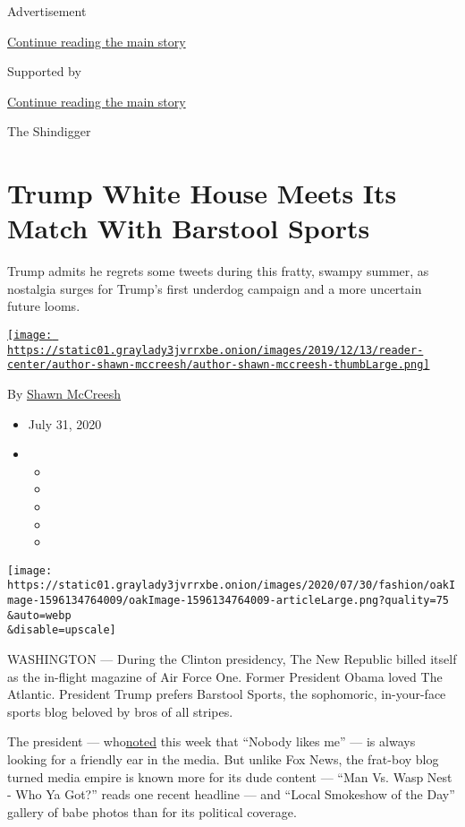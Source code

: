 Advertisement

\protect\hyperlink{after-top}{Continue reading the main story}

Supported by

\protect\hyperlink{after-sponsor}{Continue reading the main story}

The Shindigger

\hypertarget{trump-white-house-meets-its-match-with-barstool-sports}{%
\section{Trump White House Meets Its Match With Barstool
Sports}\label{trump-white-house-meets-its-match-with-barstool-sports}}

Trump admits he regrets some tweets during this fratty, swampy summer,
as nostalgia surges for Trump's first underdog campaign and a more
uncertain future looms.

\href{https://www.nytimes3xbfgragh.onion/by/shawn-mccreesh}{\texttt{[image: https://static01.graylady3jvrrxbe.onion/images/2019/12/13/reader-center/author-shawn-mccreesh/author-shawn-mccreesh-thumbLarge.png]}}

By \href{https://www.nytimes3xbfgragh.onion/by/shawn-mccreesh}{Shawn
McCreesh}

\begin{itemize}
\item
  July 31, 2020
\item
  \begin{itemize}
  \item
  \item
  \item
  \item
  \item
  \end{itemize}
\end{itemize}

\texttt{[image: https://static01.graylady3jvrrxbe.onion/images/2020/07/30/fashion/oakImage-1596134764009/oakImage-1596134764009-articleLarge.png?quality=75\\\&auto=webp\\\&disable=upscale]}

WASHINGTON --- During the Clinton presidency, The New Republic billed
itself as the in-flight magazine of Air Force One. Former President
Obama loved The Atlantic. President Trump prefers Barstool Sports, the
sophomoric, in-your-face sports blog beloved by bros of all stripes.

The president ---
who\href{https://www.nytimes3xbfgragh.onion/2020/07/28/us/politics/trump-nobody-likes-me-walks-out-briefing.html}{noted}
this week that ``Nobody likes me'' --- is always looking for a friendly
ear in the media. But unlike Fox News, the frat-boy blog turned media
empire is known more for its dude content --- ``Man Vs. Wasp Nest - Who
Ya Got?'' reads one recent headline --- and ``Local Smokeshow of the
Day'' gallery of babe photos than for its political coverage.

